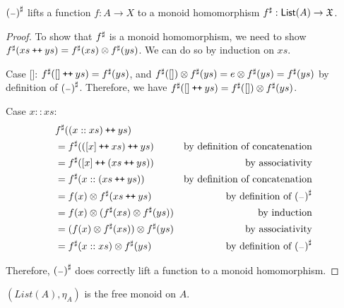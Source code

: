 \begin{proposition}
    ${({\scriptstyle{-}})}^{\sharp}$ lifts a function $f : A \to X$ to a monoid homomorphism ${f}^{\sharp} : \operatorname{\mathsf{List}}(A) \to \mathfrak{X}$.
\end{proposition}

\begin{proof}
    To show that ${f}^{\sharp}$ is a monoid homomorphism,
    we need to show ${f}^{\sharp}(xs \mathbin{\text{\ttfamily\upshape ++}} ys) = {f}^{\sharp}(xs) \otimes {f}^{\sharp}(ys)$.
    We can do so by induction on $xs$.

    Case []:
    ${f}^{\sharp}([] \mathbin{\text{\ttfamily\upshape ++}} ys) = {f}^{\sharp}(ys)$,
    and ${f}^{\sharp}([]) \otimes {f}^{\sharp}(ys) = e \otimes {f}^{\sharp}(ys) = {f}^{\sharp}(ys)$
    by definition of ${({\scriptstyle{-}})}^{\sharp}$. Therefore, we have
    ${f}^{\sharp}([] \mathbin{\text{\ttfamily\upshape ++}} ys) = {f}^{\sharp}([]) \otimes {f}^{\sharp}(ys)$.

    Case $x :: xs$:
    \begin{align*}
        & {f}^{\sharp}((x :: xs) \mathbin{\text{\ttfamily\upshape ++}} ys) \\
        & = {f}^{\sharp}(([ x ] \mathbin{\text{\ttfamily\upshape ++}} xs) \mathbin{\text{\ttfamily\upshape ++}} ys) & \text{by definition of concatenation} \\
        & = {f}^{\sharp}([ x ] \mathbin{\text{\ttfamily\upshape ++}} (xs \mathbin{\text{\ttfamily\upshape ++}} ys)) & \text{by associativity} \\
        & = {f}^{\sharp}(x :: (xs \mathbin{\text{\ttfamily\upshape ++}} ys)) & \text{by definition of concatenation} \\
        & = f(x) \otimes {f}^{\sharp}(xs \mathbin{\text{\ttfamily\upshape ++}} ys) & \text{by definition of ${({\scriptstyle{-}})}^{\sharp}$} \\
        & = f(x) \otimes ({f}^{\sharp}(xs) \otimes {f}^{\sharp}(ys)) & \text{by induction} \\
        & = (f(x) \otimes {f}^{\sharp}(xs)) \otimes {f}^{\sharp}(ys) & \text{by associativity} \\
        & = {f}^{\sharp}(x :: xs) \otimes {f}^{\sharp}(ys) & \text{by definition of ${({\scriptstyle{-}})}^{\sharp}$} \\
    \end{align*}

    Therefore, ${({\scriptstyle{-}})}^{\sharp}$ does correctly lift a function to a monoid homomorphism.
\end{proof}

\begin{proposition}
    $(List(A),\eta_A)$ is the free monoid on $A$.
\end{proposition}

